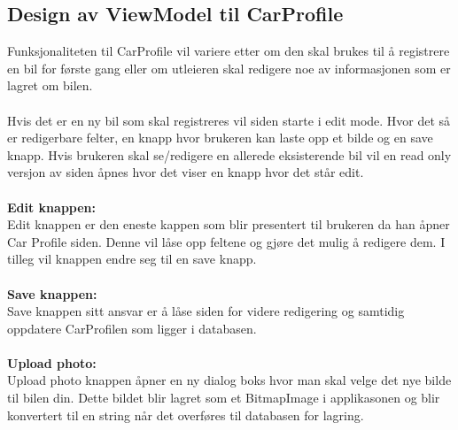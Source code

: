 \documentclass[SoftwareDesign/SoftwareDesign_main.tex]{subfiles}
\begin{document}
\subsection{Design av ViewModel til CarProfile}
Funksjonaliteten til CarProfile vil variere etter om den skal brukes til å registrere en bil for første gang eller om utleieren skal redigere noe av informasjonen som er lagret om bilen.
\\
\\
Hvis det er en ny bil som skal registreres vil siden starte i edit mode. Hvor det så er redigerbare felter, en knapp hvor brukeren kan laste opp et bilde og en save knapp. Hvis brukeren skal se/redigere en allerede eksisterende bil vil en read only versjon av siden åpnes hvor det viser en knapp hvor det står edit.
\\
\\
\textbf{Edit knappen:}\\
Edit knappen er den eneste kappen som blir presentert til brukeren da han åpner Car Profile siden. Denne vil låse opp feltene og gjøre det mulig å redigere dem. I tilleg vil knappen endre seg til en save knapp.
\\
\\
\textbf{Save knappen:}\\
Save knappen sitt ansvar er å låse siden for videre redigering og samtidig oppdatere CarProfilen som ligger i databasen.
\\
\\
\textbf{Upload photo:}\\
Upload photo knappen åpner en ny dialog boks hvor man skal velge det nye bilde til bilen din. Dette bildet blir lagret som et BitmapImage i applikasonen og blir konvertert til en string når det overføres til databasen for lagring.
\end{document}
